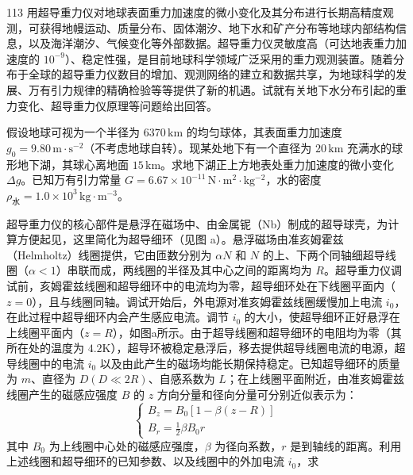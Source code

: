 \begin{problem}[第36届全国中学生物理竞赛决赛][超导重力仪与地下水重力变化]{113}
    用超导重力仪对地球表面重力加速度的微小变化及其分布进行长期高精度观测，可获得地幔运动、质量分布、固体潮汐、地下水和矿产分布等地球内部结构信息，以及海洋潮汐、气候变化等外部数据。超导重力仪灵敏度高（可达地表重力加速度的 $10^{-9}$）、稳定性强，是目前地球科学领域广泛采用的重力观测装置。随着分布于全球的超导重力仪数目的增加、观测网络的建立和数据共享，为地球科学的发展、万有引力规律的精确检验等等提供了新的机遇。试就有关地下水分布引起的重力变化、超导重力仪原理等问题给出回答。
    \begin{subproblem}
        假设地球可视为一个半径为 $6370\,\mathrm{km}$ 的均匀球体，其表面重力加速度 $g_{0}=9.80\,\mathrm{m\cdot s^{-2}}$（不考虑地球自转）。现某处地下有一个直径为 $20\,\mathrm{km}$ 充满水的球形地下湖，其球心离地面 $15\,\mathrm{km}$。求地下湖正上方地表处重力加速度的微小变化 $\Delta g$。已知万有引力常量 $G=6.67\times10^{-11}\,\mathrm{N\cdot m^{2}\cdot kg^{-2}}$，水的密度 $\rho_{\text{水}}=1.0\times10^{3}\,\mathrm{kg\cdot m^{-3}}$。
    \end{subproblem}
    \begin{subproblem}
        超导重力仪的核心部件是悬浮在磁场中、由金属铌（Nb）制成的超导球壳，为计算方便起见，这里简化为超导细环（见图 a）。悬浮磁场由准亥姆霍兹（Helmholtz）线圈提供，它由匝数分别为 $\alpha N$ 和 $N$ 的上、下两个同轴细超导线圈（$\alpha < 1$）串联而成，两线圈的半径及其中心之间的距离均为 $R$。超导重力仪调试前，亥姆霍兹线圈和超导细环中的电流均为零，超导细环处在下线圈平面内（$z = 0$），且与线圈同轴。调试开始后，外电源对准亥姆霍兹线圈缓慢加上电流 $i_{0}$，在此过程中超导细环内会产生感应电流。调节 $i_{0}$ 的大小，使超导细环正好悬浮在上线圈平面内（$z = R$），如图a所示。由于超导线圈和超导细环的电阻均为零（其所在处的温度为 $4.2\mathrm{K}$），超导环被稳定悬浮后，移去提供超导线圈电流的电源，超导线圈中的电流 $i_0$ 以及由此产生的磁场均能长期保持稳定。已知超导细环的质量为 $m$、直径为 $D(D \ll 2R)$、自感系数为 $L$；在上线圈平面附近，由准亥姆霍兹线圈产生的磁感应强度 $B$ 的 $z$ 方向分量和径向分量可分别近似表示为：
        \[
        \left\{ \begin{array}{l}
        B_{z} = B_{0}[1 - \beta(z - R)] \\
        B_{r} = \frac{1}{2} \beta B_{0} r
        \end{array} \right.
        \]
        其中 $B_{0}$ 为上线圈中心处的磁感应强度，$\beta$ 为径向系数，$r$ 是到轴线的距离。利用上述线圈和超导细环的已知参数、以及线圈中的外加电流 $i_0$，求
        \begin{subsubproblem}

\end{subsubproblem}
\end{subproblem}
\end{problem}
